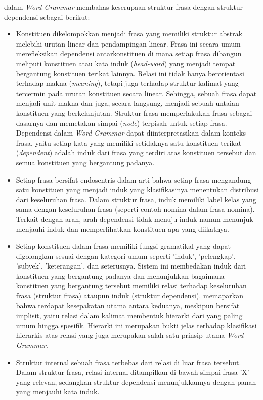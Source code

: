 \cite{hudson2010introduction} dalam \textit{Word Grammar} membahas keserupaan struktur frasa dengan struktur dependensi sebagai berikut:
\begin{itemize}
\item Konstituen dikelompokkan menjadi frasa yang memiliki struktur abstrak melebihi urutan linear dan pendampingan linear. Frasa ini secara umum merefleksikan dependensi antarkonstituen di mana setiap frasa dibangun meliputi konstituen atau kata induk (\textit{head-word}) yang menjadi tempat bergantung konstituen terikat lainnya. Relasi ini tidak hanya berorientasi terhadap makna (\textit{meaning}), tetapi juga terhadap struktur kalimat yang tercermin pada urutan konstituen secara linear. Sehingga, sebuah frasa dapat menjadi unit makna dan juga, secara langsung, menjadi sebuah untaian konstituen yang berkelanjutan. Struktur frasa memperlakukan frasa sebagai dasarnya dan memetakan \gls{simpai} (\textit{node}) terpisah untuk setiap frasa. Dependensi dalam \textit{Word Grammar} dapat diinterpretasikan dalam konteks frasa, yaitu setiap kata yang memiliki setidaknya satu konstituen terikat (\textit{dependent}) adalah induk dari frasa yang terdiri atas konstituen tersebut dan semua konstituen yang bergantung padanya.
\item Setiap frasa bersifat endosentris dalam arti bahwa setiap frasa mengandung satu konstituen yang menjadi induk yang klasifikasinya menentukan distribusi dari keseluruhan frasa. Dalam struktur frasa, induk memiliki label kelas yang sama dengan keseluruhan frasa (seperti contoh nomina dalam frasa nomina). Terkait dengan arah, \gls{arah-dependensi} tidak menuju induk namun menunjuk menjauhi induk dan memperlihatkan konstituen apa yang diikatnya.
\item Setiap konstituen dalam frasa memiliki fungsi gramatikal yang dapat digolongkan sesuai dengan kategori umum seperti 'induk', 'pelengkap', 'subyek', 'keterangan', dan seterusnya. Sistem ini membedakan induk dari konstituen yang bergantung padanya dan menunjukkan bagaimana konstituen yang bergantung tersebut memiliki relasi terhadap keseluruhan frasa (struktur frasa) ataupun induk (struktur dependensi). \cite{hudson2007language} memaparkan bahwa terdapat kesepakatan utama antara keduanya, meskipun bersifat implisit, yaitu relasi dalam kalimat membentuk hierarki dari yang paling umum hingga spesifik. Hierarki ini merupakan bukti jelas terhadap klasifikasi hierarkis atas relasi yang juga merupakan salah satu prinsip utama \textit{Word Grammar}.
\item Struktur internal sebuah frasa terbebas dari relasi di luar frasa tersebut. Dalam struktur frasa, relasi internal ditampilkan di bawah simpai frasa 'X' yang relevan, sedangkan struktur dependensi menunjukkannya dengan panah yang menjauhi kata induk.

\end{itemize}
